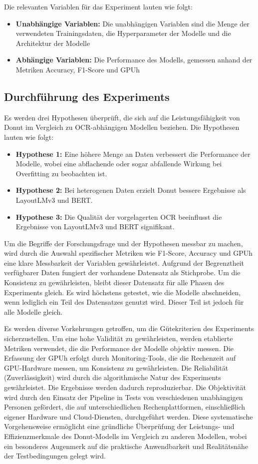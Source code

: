 Die relevanten Variablen für das Experiment lauten wie folgt:
\begin{itemize}
    \item \textbf{Unabhängige Variablen:} Die unabhängigen Variablen sind die Menge der verwendeten Trainingsdaten, die Hyperparameter der Modelle und die Architektur der Modelle
    \item \textbf{Abhängige Variablen:} Die Performance des Modells, gemessen anhand der Metriken Accuracy, F1-Score und GPUh
\end{itemize}

\subsection{Durchführung des Experiments}
Es werden drei Hypothesen überprüft, die sich auf die Leistungsfähigkeit von Donut im Vergleich zu OCR-abhängigen Modellen beziehen. Die Hypothesen lauten wie folgt:
\begin{itemize}
    \item \textbf{Hypothese 1:} Eine höhere Menge an Daten verbessert die Performance der Modelle, wobei eine abflachende oder sogar abfallende Wirkung bei Overfitting zu beobachten ist.
    \item \textbf{Hypothese 2:} Bei heterogenen Daten erzielt Donut bessere Ergebnisse als LayoutLMv3 und BERT.
    \item \textbf{Hypothese 3:} Die Qualität der vorgelagerten OCR beeinflusst die Ergebnisse von LayoutLMv3 und BERT signifikant.
\end{itemize}

Um die Begriffe der Forschungsfrage und der Hypothesen messbar zu machen, wird durch die Auswahl spezifischer Metriken wie F1-Score, Accuracy und \ac{GPUh} eine klare Messbarkeit der Variablen gewährleistet. Aufgrund der Begrenztheit verfügbarer Daten fungiert der vorhandene Datensatz als Stichprobe. Um die Konsistenz zu gewährleisten, bleibt dieser Datensatz für alle Phasen des Experiments gleich. Es wird höchstens getestet, wie die Modelle abschneiden, wenn lediglich ein Teil des Datensatzes genutzt wird. Dieser Teil ist jedoch für alle Modelle gleich. 

Es werden diverse Vorkehrungen getroffen, um die Gütekriterien des Experiments sicherzustellen. Um eine hohe Validität zu gewährleisten, werden etablierte Metriken verwendet, die die Performance der Modelle objektiv messen. Die Erfassung der \ac{GPUh} erfolgt durch Monitoring-Tools, die die Rechenzeit auf GPU-Hardware messen, um Konsistenz zu gewährleisten. Die Reliabilität (Zuverlässigkeit) wird durch die algorithmische Natur des Experiments gewährleistet. Die Ergebnisse werden dadurch reproduzierbar. Die Objektivität wird durch den Einsatz der Pipeline in Tests von verschiedenen unabhängigen Personen gefördert, die auf unterschiedlichen Rechenplattformen, einschließlich eigener Hardware und Cloud-Diensten, durchgeführt werden. Diese systematische Vorgehensweise ermöglicht eine gründliche Überprüfung der Leistungs- und Effizienzmerkmale des Donut-Modells im Vergleich zu anderen Modellen, wobei ein besonderes Augenmerk auf die praktische Anwendbarkeit und Realitätsnähe der Testbedingungen gelegt wird.

